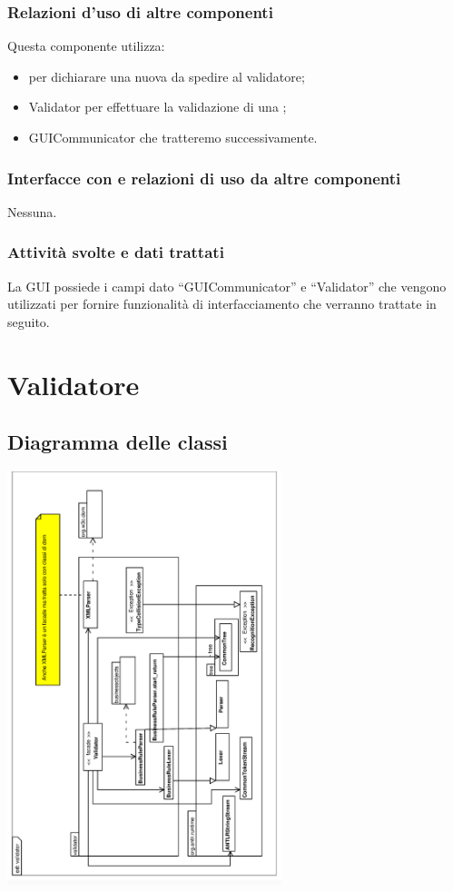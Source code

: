 \documentclass[11pt,titlepage,a4paper]{report}
\begin{document}
\subsubsection{Relazioni d'uso di altre componenti}
Questa componente utilizza:
\begin{itemize}
 \item \BR per dichiarare una nuova \br da spedire al validatore;
 \item Validator per effettuare la validazione di una \br;
 \item GUICommunicator che tratteremo successivamente.
\end{itemize}
\subsubsection{Interfacce con e relazioni di uso da altre componenti}
Nessuna.
\subsubsection{Attivit\`a svolte e dati trattati}
La GUI possiede i campi dato ``GUICommunicator'' e ``Validator'' che vengono utilizzati per fornire funzionalit\`a di interfacciamento che verranno trattate in seguito.

\section{Validatore}
\subsection{Diagramma delle classi}
\begin{center}
\includegraphics[width=0.6\textwidth, angle=-90]{DiagrammaClassi/validator.eps}
\end{center}
\end{document}
